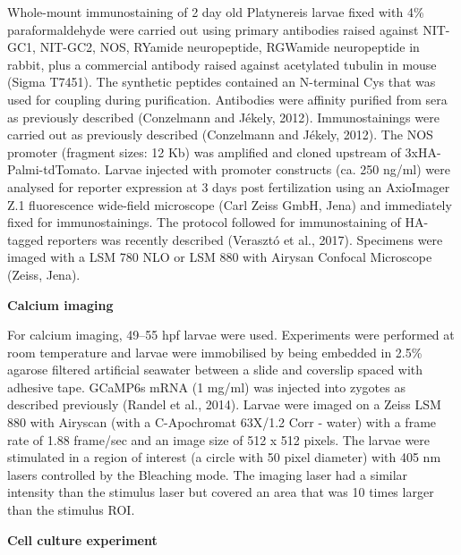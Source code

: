 \documentclass[
  10pt,
  onecolumn]{article}
\begin{document}
Whole-mount immunostaining of 2 day old Platynereis larvae fixed with
4\% paraformaldehyde were carried out using primary antibodies raised
against NIT-GC1, NIT-GC2, NOS, RYamide neuropeptide, RGWamide
neuropeptide in rabbit, plus a commercial antibody raised against
acetylated tubulin in mouse (Sigma T7451). The synthetic peptides
contained an N-terminal Cys that was used for coupling during
purification. Antibodies were affinity purified from sera as previously
described (Conzelmann and Jékely, 2012). Immunostainings were carried
out as previously described (Conzelmann and Jékely, 2012). The NOS
promoter (fragment sizes: 12 Kb) was amplified and cloned upstream of
3xHA- Palmi-tdTomato. Larvae injected with promoter constructs (ca. 250
ng/ml) were analysed for reporter expression at 3 days post
fertilization using an AxioImager Z.1 fluorescence wide-field microscope
(Carl Zeiss GmbH, Jena) and immediately fixed for immunostainings. The
protocol followed for immunostaining of HA-tagged reporters was recently
described (Verasztó et al., 2017). Specimens were imaged with a LSM 780
NLO or LSM 880 with Airysan Confocal Microscope (Zeiss, Jena).

\textbf{Calcium imaging}

For calcium imaging, 49--55 hpf larvae were used. Experiments were
performed at room temperature and larvae were immobilised by being
embedded in 2.5\% agarose filtered artificial seawater between a slide
and coverslip spaced with adhesive tape. GCaMP6s mRNA (1 mg/ml) was
injected into zygotes as described previously (Randel et al., 2014).
Larvae were imaged on a Zeiss LSM 880 with Airyscan (with a C-Apochromat
63X/1.2 Corr - water) with a frame rate of 1.88 frame/sec and an image
size of 512 x 512 pixels. The larvae were stimulated in a region of
interest (a circle with 50 pixel diameter) with 405 nm lasers controlled
by the Bleaching mode. The imaging laser had a similar intensity than
the stimulus laser but covered an area that was 10 times larger than the
stimulus ROI.

\textbf{Cell culture experiment}
\end{document}
